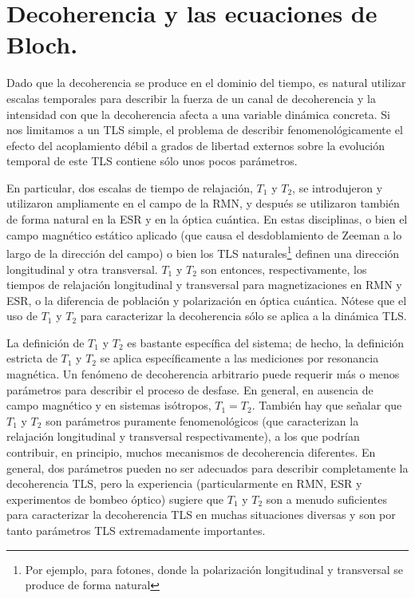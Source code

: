 \documentclass[a4paper,11pt]{book} %
\numberwithin{equation}{chapter}
\begin{document}
	\section{Decoherencia y las ecuaciones de Bloch.}
	
Dado que la decoherencia se produce en el dominio del tiempo, es natural utilizar escalas temporales para describir la fuerza de un canal de decoherencia y la intensidad con que la decoherencia afecta a una variable dinámica concreta. Si nos limitamos a un TLS simple, el problema de describir fenomenológicamente el efecto del acoplamiento débil a grados de libertad externos sobre la evolución temporal de este TLS contiene sólo unos pocos parámetros. 

En particular, dos escalas de tiempo de relajación, $T_1$ y $T_2$, se introdujeron y utilizaron ampliamente en el campo de la RMN, y después se utilizaron también de forma natural en la ESR y en la óptica cuántica. En estas disciplinas, o bien el campo magnético estático aplicado (que causa el desdoblamiento de Zeeman a lo largo de la dirección del campo) o bien los TLS naturales\footnote{Por ejemplo, para fotones, donde la polarización longitudinal y transversal se produce de forma natural} definen una dirección longitudinal y otra transversal. $T_1$ y $T_2$ son entonces, respectivamente, los tiempos de relajación longitudinal y transversal para magnetizaciones en RMN y ESR, o la diferencia de población y polarización en óptica cuántica. Nótese que el uso de $T_1$ y $T_2$ para caracterizar la decoherencia sólo se aplica a la dinámica TLS.

La definición de $T_1$ y $T_2$ es bastante específica del sistema; de hecho, la definición estricta de $T_1$ y $T_2$ se aplica específicamente a las mediciones por resonancia magnética. Un fenómeno de decoherencia arbitrario puede requerir más o menos parámetros para describir el proceso de desfase. En general, en ausencia de campo magnético y en sistemas isótropos, $T_1 = T_2$. También hay que señalar que $T_1$ y $T_2$ son parámetros puramente fenomenológicos (que caracterizan la relajación longitudinal y transversal respectivamente), a los que podrían contribuir, en principio, muchos mecanismos de decoherencia diferentes. En general, dos parámetros pueden no ser adecuados para describir completamente la decoherencia TLS, pero la experiencia (particularmente en RMN, ESR y experimentos de bombeo óptico) sugiere que $T_1$ y $T_2$ son a menudo suficientes para caracterizar la decoherencia TLS en muchas situaciones diversas y son por tanto parámetros TLS extremadamente importantes.
\end{document}
